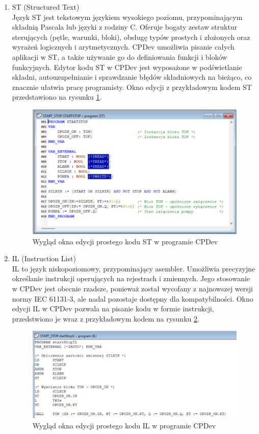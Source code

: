 \documentclass[12pt,twoside]{article}
\begin{document}
\begin{enumerate}[label=\alph*), leftmargin=1.25cm]
    \item ST (Structured Text)\\
    Język ST jest tekstowym językiem wysokiego poziomu, przypominającym składnią Pascala lub języki z rodziny C. Oferuje bogaty zestaw struktur sterujących (pętle, warunki, bloki), obsługę typów prostych i złożonych oraz wyrażeń logicznych i arytmetycznych. CPDev umożliwia pisanie całych aplikacji w ST, a także używanie go do definiowania funkcji i bloków funkcyjnych. Edytor kodu ST w CPDev jest wyposażone w podświetlanie składni, autouzupełnianie i sprawdzanie błędów składniowych na bieżąco, co znacznie ułatwia pracę programisty. Okno edycji z przykładowym kodem ST przedstawiono na rysunku \ref{Fig:startStopST}.

   \begin{figure}[ht]
   \centering
   \includegraphics[width=12cm]{images/startStopST.png}
   \caption{Wygląd okna edycji prostego kodu ST w programie CPDev}
   \label{Fig:startStopST}
   \end{figure}

    \item IL (Instruction List)\\
    IL to język niskopoziomowy, przypominający asembler. Umożliwia precyzyjne określanie instrukcji operujących na rejestrach i zmiennych. Jego stosowanie w CPDev jest obecnie rzadsze, ponieważ został wycofany z najnowszej wersji normy IEC 61131-3, ale nadal pozostaje dostępny dla kompatybilności. Okno edycji IL w CPDev pozwala na pisanie kodu w formie instrukcji, przedstwiono je wraz z przykładowym kodem na rysunku \ref{Fig:startStopIL}. 

   \begin{figure}[ht]
   \centering
   \includegraphics[width=13cm]{images/startStopIL.png}
   \caption{Wygląd okna edycji prostego kodu IL w programie CPDev}
   \label{Fig:startStopIL}
   \end{figure}


\end{enumerate}
\end{document}
